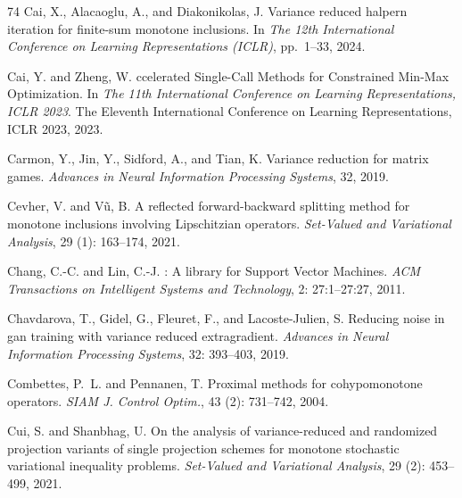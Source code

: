 \documentclass{article}
\theoremstyle{plain}
\theoremstyle{definition}
\theoremstyle{remark}
\begin{document}
\begin{thebibliography}{74}
Cai, X., Alacaoglu, A., and Diakonikolas, J.
\newblock Variance reduced halpern iteration for finite-sum monotone
  inclusions.
\newblock In \emph{The 12th International Conference on Learning
  Representations (ICLR)}, pp.\  1--33, 2024.

Cai, Y. and Zheng, W.
ccelerated {S}ingle-{C}all {M}ethods for {C}onstrained {M}in-{M}ax
  {O}ptimization.
\newblock In \emph{The 11th International Conference on Learning
  Representations, ICLR 2023}. The Eleventh International Conference on
  Learning Representations, ICLR 2023, 2023.

Carmon, Y., Jin, Y., Sidford, A., and Tian, K.
\newblock Variance reduction for matrix games.
\newblock \emph{Advances in Neural Information Processing Systems}, 32, 2019.

Cevher, V. and V{\~u}, B.
\newblock A reflected forward-backward splitting method for monotone inclusions
  involving {L}ipschitzian operators.
\newblock \emph{Set-Valued and Variational Analysis}, 29 (1):
  163--174, 2021.

Chang, C.-C. and Lin, C.-J.
: {A} library for {S}upport {V}ector {M}achines.
\newblock \emph{ACM Transactions on Intelligent Systems and Technology},
  2: 27:1--27:27, 2011.

Chavdarova, T., Gidel, G., Fleuret, F., and Lacoste-Julien, S.
\newblock Reducing noise in gan training with variance reduced extragradient.
\newblock \emph{Advances in Neural Information Processing Systems},
  32: 393--403, 2019.

Combettes, P.~L. and Pennanen, T.
\newblock Proximal methods for cohypomonotone operators.
\newblock \emph{SIAM J. Control Optim.}, 43 (2): 731--742,
  2004.

Cui, S. and Shanbhag, U.
\newblock On the analysis of variance-reduced and randomized projection
  variants of single projection schemes for monotone stochastic variational
  inequality problems.
\newblock \emph{Set-Valued and Variational Analysis}, 29 (2):
  453--499, 2021.


\end{thebibliography}
\end{document}
